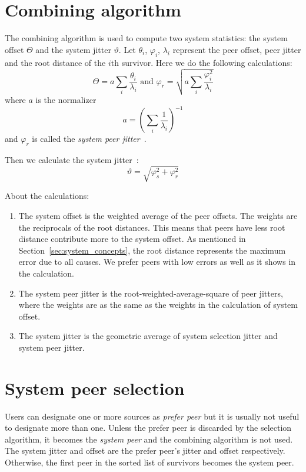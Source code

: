 \section{Combining algorithm}%
\label{sec:combine_algorithm}
The combining algorithm is used to compute two system statistics: the system
offset $\Theta$ and the system jitter $\vartheta$. Let $\theta_i$, $\varphi_i$,
$\lambda_i$ represent the peer offset, peer jitter and the root distance of the
$i$th survivor. Here we do the following calculations:~\cite{redbook}
\begin{equation}
    \Theta = a \sum^{}_{i} \frac{\theta_i}{\lambda_i} \text{ and } 
    \varphi_r = \sqrt{a \sum^{}_{i} \frac{\varphi_i ^ 2}{\lambda_i}}
    \label{eq:system_offset_selection_jitter}
\end{equation}
where $a$ is the normalizer
\begin{equation}
    a = \left( \sum^{}_{i} \frac{1}{\lambda_i} \right) ^ {-1}
    \label{eq:normalizer}
\end{equation}
and $\varphi_r$ is called the \emph{system peer jitter}~\cite{rfc5905}.

Then we calculate the system jitter~\cite{redbook}:
\begin{equation}
    \vartheta = \sqrt{\varphi_s^2 + \varphi_r^2}
    \label{eq:system_jitter}
\end{equation}

About the calculations:
\begin{enumerate}
    \item The system offset is the weighted average of the peer offsets. The
        weights are the reciprocals of the root distances. This means that peers
        have less root distance contribute more to the system offset. As
        mentioned in Section~\ref{sec:system_concepts}, the root distance
        represents the maximum error due to all causes. We prefer peers with
        low errors as well as it shows in the calculation.
    \item The system peer jitter is the root-weighted-average-square of peer
        jitters, where the weights are as the same as the weights in the
        calculation of system offset.
    \item The system jitter is the geometric average of system selection jitter
        and system peer jitter.
\end{enumerate}

\section{System peer selection}%
\label{sec:system_peer_selection}
Users can designate one or more sources as \emph{prefer peer} but it is
usually not useful to designate more than one. Unless the prefer peer is
discarded by the selection algorithm, it becomes the \emph{system peer} and
the combining algorithm is not used. The system jitter and offset are the
prefer peer's jitter and offset respectively. Otherwise, the first peer in
the sorted list of survivors becomes the system peer. 

